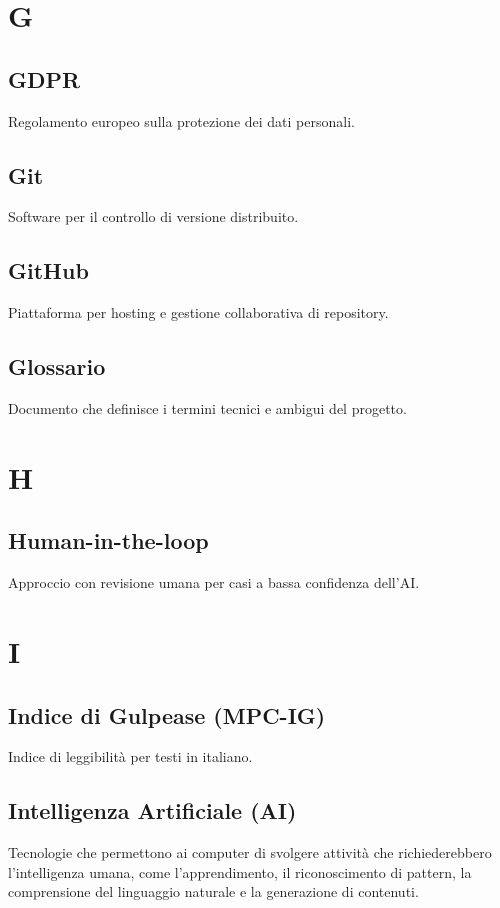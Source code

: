 \documentclass[a4paper,12pt]{article}
\begin{document}
\section{G}
\subsection{GDPR}
Regolamento europeo sulla protezione dei dati personali.

\subsection{Git}
Software per il controllo di versione distribuito.

\subsection{GitHub}
Piattaforma per hosting e gestione collaborativa di repository.

\subsection{Glossario}
Documento che definisce i termini tecnici e ambigui del progetto.

\section{H}
\subsection{Human-in-the-loop}
Approccio con revisione umana per casi a bassa confidenza dell'AI.

\section{I}
\subsection{Indice di Gulpease (MPC-IG)}
Indice di leggibilità per testi in italiano.

\subsection{Intelligenza Artificiale (AI)}
Tecnologie che permettono ai computer di svolgere attività che richiederebbero l'intelligenza umana, come l'apprendimento, il riconoscimento di pattern, la comprensione del linguaggio naturale e la generazione di contenuti.
\end{document}
